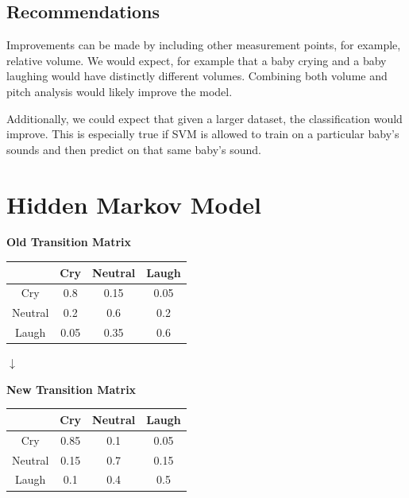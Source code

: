 \documentclass[paper=a4, fontsize=11pt]{scrartcl}
\numberwithin{equation}{section}
\numberwithin{figure}{section}
\numberwithin{table}{section}
\begin{document}
\subsection{Recommendations}
Improvements can be made by including other measurement points, for example, relative volume. We would expect, for example that a baby crying and a baby laughing would have distinctly different volumes. Combining both volume and pitch analysis would likely improve the model.

Additionally, we could expect that given a larger dataset, the classification would improve. This is especially true if SVM is allowed to train on a particular baby's sounds and then predict on that same baby's sound.

\section{Hidden Markov Model} 

\begin{center}
\textbf{Old Transition Matrix}

\begin{tabular}{ |c|c|c|c| } 
 \hline
       & Cry & Neutral & Laugh \\
 \hline
 Cry & 0.8 & 0.15 & 0.05 \\ 
 Neutral & 0.2 & 0.6 & 0.2 \\ 
 Laugh & 0.05 & 0.35 & 0.6 \\
 \hline
\end{tabular}

\begin{huge}$\downarrow$\end{huge}

\textbf{New Transition Matrix}

\begin{tabular}{ |c|c|c|c| } 
 \hline
       & Cry & Neutral & Laugh \\
 \hline
 Cry & 0.85 & 0.1 & 0.05 \\ 
 Neutral & 0.15 & 0.7 & 0.15 \\ 
 Laugh & 0.1 & 0.4 & 0.5 \\
 \hline
\end{tabular}
\end{center}
\end{document}
